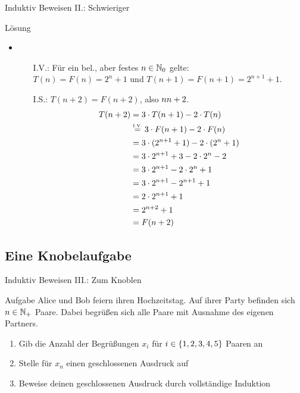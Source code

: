 \begin{frame}{Induktiv Beweisen II.: Schwieriger}
	\begin{block}{Lösung}
	\begin{itemize}
		\item 
		\begin{itemize}
				\item[I.V.:] Für ein bel., aber festes $n \in \mathbb{N}_0$ gelte: \\
				 $T(n)=F(n)=2^n+1$ und $T(n+1)=F(n+1)=2^{n+1}+1$.
				\item[I.S.:] \zz $T(n+2) = F(n+2)$, also $n \notStephan{\leadsto} \Stephan{\curvearrowright} n+2$.
				\begin{align*}
					T(n+2) &= 3 \cdot T(n+1) - 2 \cdot T(n) \\
						   &\eqtext{I.V.} 3 \cdot F(n+1) - 2 \cdot F(n) \\
						   &= 3 \cdot (2^{n+1}+1) - 2 \cdot (2^n+1) \\
						   &= 3 \cdot 2^{n+1} + 3 - 2 \cdot 2^n - 2 \\
						   &= 3 \cdot 2^{n+1} - 2 \cdot 2^n + 1 \\
						   &= 3 \cdot 2^{n+1} - 2^{n+1} +1 \\
						   &= 2 \cdot 2^{n+1} + 1 \\
						   &= 2^{n+2} + 1 \\
						   &=F(n+2)
				\end{align*}
			\end{itemize}
	\end{itemize}
	\end{block}
\end{frame}
\subsection{Eine Knobelaufgabe}
\begin{frame}{Induktiv Beweisen III.: Zum Knoblen}
	\begin{exampleblock}{Aufgabe}
		Alice und Bob feiern ihren Hochzeitstag. Auf ihrer Party befinden sich $n \in \mathbb{N}_+$ Paare. Dabei begrüßen sich alle Paare mit Ausnahme des eigenen Partners.\\
		\begin{enumerate}
			\item Gib die Anzahl der Begrüßungen $x_i$ für $i \in \{ 1,2,3,4,5 \}$ Paaren an
			\item Stelle für $x_n$ einen geschlossenen Ausdruck auf
			\item Beweise deinen geschlossenen Ausdruck durch vollständige Induktion
		\end{enumerate}
	\end{exampleblock}
\end{frame}

